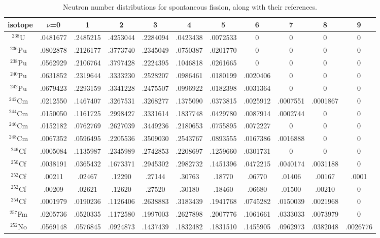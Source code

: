 \begin{table}[ht]
\footnotesize
\begin{center}
\begin{tabular}{|c|cccccccccc|} \hline
isotope & $\nu$=0 & 1 & 2 & 3 & 4 & 5 & 6 & 7 & 8 & 9 \\ \hline
$^{238}$U~\cite{Holden and Zucker BNL} & .0481677 & .2485215 & .4253044 & .2284094 & .0423438 & .0072533 & 0 & 0 & 0 & 0 \\
$^{236}$Pu~\cite{Santi 2005} & .0802878 & .2126177 & .3773740 & .2345049 & .0750387 & .0201770 & 0 & 0 & 0 & 0 \\
$^{238}$Pu~\cite{Santi 2005} & .0562929 & .2106764 & .3797428 & .2224395 & .1046818 & .0261665 & 0 & 0 & 0 & 0 \\
$^{240}$Pu~\cite{Holden and Zucker BNL} & .0631852 & .2319644 & .3333230 & .2528207 & .0986461 & .0180199 & .0020406 & 0 & 0 & 0 \\
$^{242}$Pu~\cite{Holden and Zucker BNL} & .0679423 & .2293159 & .3341228 & .2475507 & .0996922 & .0182398 & .0031364 & 0 & 0 & 0 \\
$^{242}$Cm~\cite{Holden and Zucker BNL} & .0212550 & .1467407 & .3267531 & .3268277 & .1375090 & .0373815 & .0025912 & .0007551 & .0001867 & 0 \\
$^{244}$Cm~\cite{Holden and Zucker BNL} & .0150050 & .1161725 & .2998427 & .3331614 & .1837748 & .0429780 & .0087914 & .0002744 & 0 & 0 \\
$^{246}$Cm~\cite{BNL-36467} & .0152182 & .0762769 & .2627039 & .3449236 & .2180653 & .0755895 & .0072227 & 0 & 0 & 0 \\
$^{248}$Cm~\cite{BNL-36467} & .0067352 & .0596495 & .2205536 & .3509030 & .2543767 & .0893555 & .0167386 & .0016888 & 0 & 0 \\
$^{246}$Cf~\cite{Dakavoski 1973} & .0005084 & .1135987 & .2345989 & .2742853 & .2208697 & .1259660 & .0301731 & 0 & 0 & 0 \\
$^{250}$Cf~\cite{Hoffman 1980} & .0038191 & .0365432 & .1673371 & .2945302 & .2982732 & .1451396 & .0472215 & .0040174 & .0031188 & 0 \\
$^{252}$Cf~\cite{Spencer 1982} & .00211 & .02467 & .12290 & .27144 & .30763 & .18770 & .06770 & .01406 & .00167 & .0001 \\
$^{252}$Cf~\cite{Boldeman 1985} & .00209 & .02621 & .12620 & .27520 & .30180 & .18460 & .06680 & .01500& .00210 & 0 \\
$^{254}$Cf~\cite{Hoffman 1980} & .0001979 & .0190236 & .1126406 & .2638883 & .3183439 & .1941768 & .0745282 & .0150039 & .0021968 & 0 \\
$^{257}$Fm~\cite{Hoffman 1980} & .0205736 & .0520335 & .1172580 & .1997003 & .2627898 & .2007776 & .1061661 & .0333033 & .0073979 & 0 \\
$^{252}$No~\cite{Lazarev 1974} & .0569148 & .0576845 & .0924873 & .1437439 & .1832482 & .1831510 & .1455905 & .0962973 & .0382048 & .0026776 \\ \hline
\end{tabular}
\end{center}
\caption{Neutron number distributions for spontaneous fission, along with their references.}
\label{Neutron number distribution for spontaneous fission}
\end{table}

